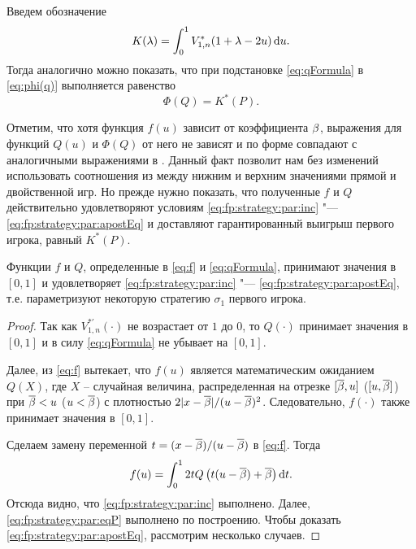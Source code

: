 {Введем обозначение
\begin{equation*}
  K(\lambda) = \int_0^1 V^*_{1,n}(1+\lambda-2u) \mathop{}\!\mathrm{d} u.
\end{equation*}
Тогда аналогично \cite{demeyer02} можно показать, что при подстановке
\eqref{eq:qFormula} в \eqref{eq:phi(q)} выполняется равенство
\begin{equation}\label{eq:phi=k*}
  \Phi(Q) = K^*(P).
\end{equation}

Отметим, что хотя функция $f(u)$ зависит от коэффициента $\beta$, выражения для функций $Q(u)$ и $\Phi(Q)$ от него не зависят и по форме совпадают с аналогичными выражениями в \cite{demeyer02}.
Данный факт позволит нам без изменений использовать соотношения из \cite{demeyer02} между нижним и верхним значениями прямой и двойственной игр.
Но прежде нужно показать, что полученные $f$ и $Q$ действительно удовлетворяют условиям \eqref{eq:fp:strategy:par:inc} "--- \eqref{eq:fp:strategy:par:apostEq} и доставляют гарантированный выигрыш первого игрока, равный $K^*(P)$.

\begin{lemma}
  \label{lemma:fp:fQ:isStrategy}
  Функции $f$ и $Q$\textnormal{,} определенные в \eqref{eq:f} и \eqref{eq:qFormula}\textnormal{,} принимают значения в $[0, 1]$ и удовлетворяет \eqref{eq:fp:strategy:par:inc} "--- \eqref{eq:fp:strategy:par:apostEq}\textnormal{,} т.е. параметризуют некоторую стратегию $\sigma_1$ первого игрока.
\end{lemma}
\begin{proof}
  Так как $V^{*\prime}_{1,n}(\cdot)$ не возрастает от $1$ до $0$, то $Q(\cdot)$ принимает значения в $[0, 1]$ и в силу \eqref{eq:qFormula} не убывает на $[0, 1]$.

  Далее, из \eqref{eq:f} вытекает, что $f(u)$ является математическим ожиданием $Q(X)$, где $X$ -- случайная величина, распределенная на отрезке $[{\overline{\beta}}, u]$ ($[u, {\overline{\beta}}]$) при ${\overline{\beta}} < u$ ($u < {\overline{\beta}}$) с плотностью $2|x-{\overline{\beta}}|/(u-{\overline{\beta}})^2$.
  Следовательно, $f(\cdot)$ также принимает значения в $[0, 1]$.

  Сделаем замену переменной $t = (x - {\overline{\beta}})/(u - {\overline{\beta}})$ в \eqref{eq:f}. Тогда
  \begin{equation*}
    f(u) = \int_0^1 2 t Q \left( t(u - {\overline{\beta}}) + {\overline{\beta}} \right) \mathop{}\!\mathrm{d} t.
  \end{equation*}
  Отсюда видно, что \eqref{eq:fp:strategy:par:inc} выполнено. Далее, \eqref{eq:fp:strategy:par:eqP} выполнено по построению.
  Чтобы доказать \eqref{eq:fp:strategy:par:apostEq}, рассмотрим несколько случаев.


\end{proof}}
